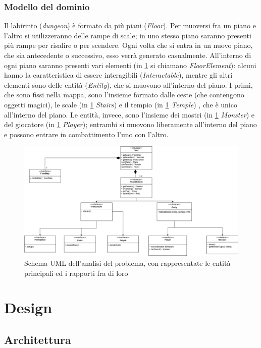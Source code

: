 \documentclass{report}
\begin{document}
\subsection{Modello del dominio}

Il labirinto (\textit{dungeon}) è formato da più piani (\textit{Floor}). 
%
Per muoversi fra un piano e l’altro si utilizzeranno delle rampe di scale; in uno stesso piano saranno presenti più rampe per risalire o per scendere. 
%
Ogni volta che si entra in un nuovo piano, che sia antecedente o successivo, esso verrà generato casualmente. 
%
All’interno di ogni piano saranno presenti vari elementi (in \ref{Figura 1.1} si chiamano \textit{FloorElement}): alcuni hanno la caratteristica di essere interagibili (\textit{Interactable}), mentre gli altri elementi sono delle entità (\textit{Entity}), che si muovono all’interno del piano. 
%
I primi, che sono fissi nella mappa, sono l’insieme formato dalle ceste (che contengono oggetti magici), le scale (in \ref{Figura 1.1} \textit{Stairs}) e il tempio (in \ref{Figura 1.1} \textit{Temple}) , che è unico all’interno del piano. 
%
Le entità, invece, sono l’insieme dei mostri (in \ref{Figura 1.1} \textit{Monster}) e del giocatore (in \ref{Figura 1.1} \textit{Player}); entrambi si muovono liberamente all’interno del piano e possono entrare in combattimento l’uno con l’altro. 

\begin{figure}
    \centering
    \includegraphics[width=12cm]{DiagrammaUMLGenerale.png}
    \caption{Schema UML dell'analisi del problema, con rappresentate le entità principali ed i rapporti fra di loro}
    \label{Figura 1.1}
\end{figure}

\chapter{Design}

\section{Architettura}
\end{document}
